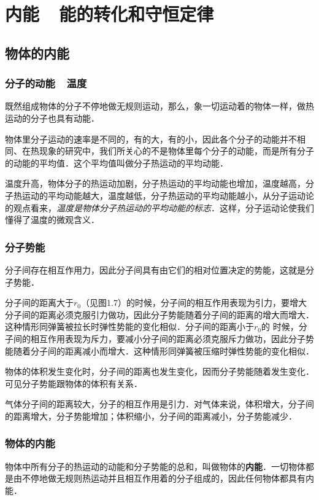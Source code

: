 
\chapter{内能~~能的转化和守恒定律}

\section{物体的内能}
\subsection{分子的动能~~温度} 
既然组成物体的分子不停地做无规则运动，那么，象一切运动着的物体一样，做热运动的分子也具有动能．

物体里分子运动的速率是不同的，有的大，有的小，因此各个分子的动能并不相同、在热现象的研究中，我们所关心的不是物体里每个分子的动能，而是所有分子的动能的平均值．这个平均值叫做分子热运动的平均动能．

温度升高，物体分子的热运动加剧，分子热运动的平均动能也增加，温度越高，分子热运动的平均动能越大，温度越低，分子热运动的平均动能越小，从分子运动论的观点看来，\textit{温度是物体分子热运动的平均动能的标志}．这样，分子运动论使我们懂得了温度的微观含义．

\subsection{分子势能} 

分子间存在相互作用力，因此分子间具有由它们的相对位置决定的势能，这就是分子势能．

分子间的距离大于$r_0$（见图1.7）的时候，分子间的相互作用表现为引力，要增大分子间的距离必须克服引力做功，因此分子势能随着分子间的距离的增大而增大．这种情形同弹簧被拉长时弹性势能的变化相似．分子间的距离小于$r_0$的
时候，分子间的相互作用表现为斥力，要减小分子间的距离必须克服斥力做功，因此分子势能随着分子间的距离减小而增大．这种情形同弹簧被压缩时弹性势能的变化相似．

物体的体积发生变化时，分子间的距离也发生变化，因而分子势能随着发生变化．可见分子势能跟物体的体积有关系．

气体分子间的距离较大，分子的相互作用是引力．对气体来说，体积增大，分子间的距离增大，分子势能增加；体积缩小，分子间的距离减小，分子势能减少．

\subsection{物体的内能} 

物体中所有分子的热运动的动能和分子势能的总和，叫做物体的\textbf{内能}．一切物体都是由不停地做无规则热运动并且相互作用着的分子组成的，因此任何物体都具有内能．

